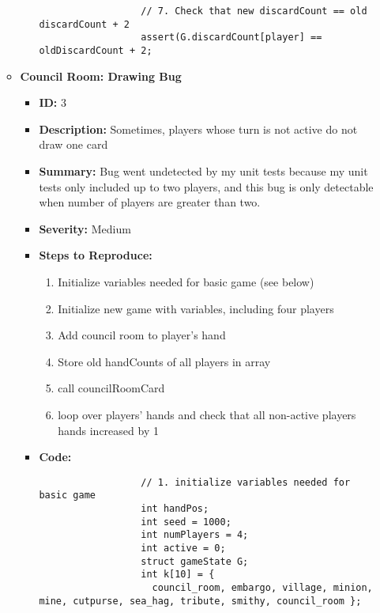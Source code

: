 \documentclass[11pt,letterpaper]{article}
\begin{document}
\begin{enumerate}[label=\Roman*.]
\begin{itemize}[label=]
\begin{itemize}[label=]
\begin{lstlisting}
                  // 7. Check that new discardCount == old discardCount + 2
                  assert(G.discardCount[player] == oldDiscardCount + 2;
                \end{lstlisting}
        \end{itemize}

      \item \textbf{Council Room: Drawing Bug}
        \begin{itemize}[label=]
          \item \textbf{ID:} 3
          \item \textbf{Description:} Sometimes, players whose turn is not active do not draw one card
          \item \textbf{Summary:} Bug went undetected by my unit tests because my unit tests only included
            up to two players, and this bug is only detectable when number of players are
            greater than two. 

          \item \textbf{Severity:} Medium
          \item \textbf{Steps to Reproduce:} 
            \begin{enumerate}
              \item Initialize variables needed for basic game (see below)
              \item Initialize new game with variables, including four players
              \item Add council room to player's hand
              \item Store old handCounts of all players in array
              \item call councilRoomCard
              \item loop over players' hands and check that all non-active players hands increased by 1
            \end{enumerate}
          \item \textbf{Code:} 

                \begin{lstlisting}
                  // 1. initialize variables needed for basic game
                  int handPos;                             
                  int seed = 1000;                      
                  int numPlayers = 4;                   
                  int active = 0;                       
                  struct gameState G;
                  int k[10] = {
                    council_room, embargo, village, minion, mine, cutpurse, sea_hag, tribute, smithy, council_room }; 


\end{lstlisting}
\end{itemize}
\end{itemize}
\end{enumerate}
\end{document}
